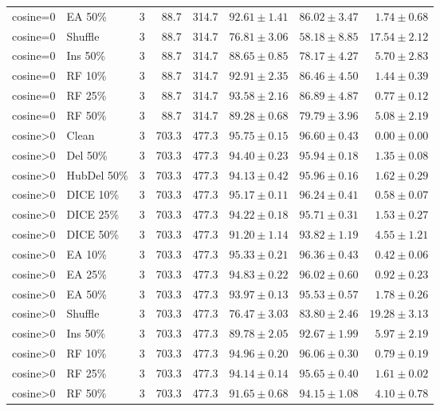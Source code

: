 {\begin{longtable}{llrrrrrr}
cosine=0 & EA 50\% & 3 & 88.7 & 314.7 & $92.61\pm1.41$ & $86.02\pm3.47$ & $1.74\pm0.68$ \\
cosine=0 & Shuffle & 3 & 88.7 & 314.7 & $76.81\pm3.06$ & $58.18\pm8.85$ & $17.54\pm2.12$ \\
cosine=0 & Ins 50\% & 3 & 88.7 & 314.7 & $88.65\pm0.85$ & $78.17\pm4.27$ & $5.70\pm2.83$ \\
cosine=0 & RF 10\% & 3 & 88.7 & 314.7 & $92.91\pm2.35$ & $86.46\pm4.50$ & $1.44\pm0.39$ \\
cosine=0 & RF 25\% & 3 & 88.7 & 314.7 & $93.58\pm2.16$ & $86.89\pm4.87$ & $0.77\pm0.12$ \\
cosine=0 & RF 50\% & 3 & 88.7 & 314.7 & $89.28\pm0.68$ & $79.79\pm3.96$ & $5.08\pm2.19$ \\
cosine>0 & Clean & 3 & 703.3 & 477.3 & $95.75\pm0.15$ & $96.60\pm0.43$ & $0.00\pm0.00$ \\
cosine>0 & Del 50\% & 3 & 703.3 & 477.3 & $94.40\pm0.23$ & $95.94\pm0.18$ & $1.35\pm0.08$ \\
cosine>0 & HubDel 50\% & 3 & 703.3 & 477.3 & $94.13\pm0.42$ & $95.96\pm0.16$ & $1.62\pm0.29$ \\
cosine>0 & DICE 10\% & 3 & 703.3 & 477.3 & $95.17\pm0.11$ & $96.24\pm0.41$ & $0.58\pm0.07$ \\
cosine>0 & DICE 25\% & 3 & 703.3 & 477.3 & $94.22\pm0.18$ & $95.71\pm0.31$ & $1.53\pm0.27$ \\
cosine>0 & DICE 50\% & 3 & 703.3 & 477.3 & $91.20\pm1.14$ & $93.82\pm1.19$ & $4.55\pm1.21$ \\
cosine>0 & EA 10\% & 3 & 703.3 & 477.3 & $95.33\pm0.21$ & $96.36\pm0.43$ & $0.42\pm0.06$ \\
cosine>0 & EA 25\% & 3 & 703.3 & 477.3 & $94.83\pm0.22$ & $96.02\pm0.60$ & $0.92\pm0.23$ \\
cosine>0 & EA 50\% & 3 & 703.3 & 477.3 & $93.97\pm0.13$ & $95.53\pm0.57$ & $1.78\pm0.26$ \\
cosine>0 & Shuffle & 3 & 703.3 & 477.3 & $76.47\pm3.03$ & $83.80\pm2.46$ & $19.28\pm3.13$ \\
cosine>0 & Ins 50\% & 3 & 703.3 & 477.3 & $89.78\pm2.05$ & $92.67\pm1.99$ & $5.97\pm2.19$ \\
cosine>0 & RF 10\% & 3 & 703.3 & 477.3 & $94.96\pm0.20$ & $96.06\pm0.30$ & $0.79\pm0.19$ \\
cosine>0 & RF 25\% & 3 & 703.3 & 477.3 & $94.14\pm0.14$ & $95.65\pm0.40$ & $1.61\pm0.02$ \\
cosine>0 & RF 50\% & 3 & 703.3 & 477.3 & $91.65\pm0.68$ & $94.15\pm1.08$ & $4.10\pm0.78$ \\

\end{longtable}}
